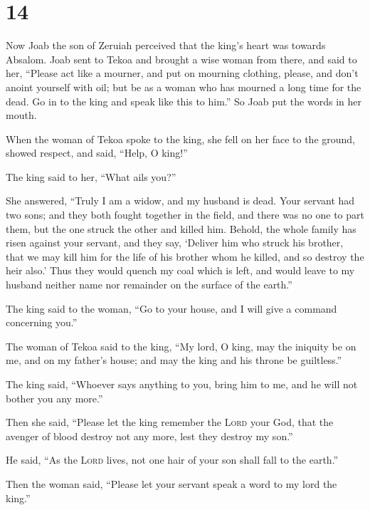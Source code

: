 \hypertarget{section-13}{%
\section{14}\label{section-13}}

 Now Joab the son of Zeruiah perceived that the king's
heart was towards Absalom.  Joab sent to Tekoa and brought
a wise woman from there, and said to her, ``Please act like a mourner,
and put on mourning clothing, please, and don't anoint yourself with
oil; but be as a woman who has mourned a long time for the dead.
 Go in to the king and speak like this to him.'' So Joab
put the words in her mouth.

 When the woman of Tekoa spoke to the king, she fell on
her face to the ground, showed respect, and said, ``Help, O king!''

 The king said to her, ``What ails you?''

She answered, ``Truly I am a widow, and my husband is dead.
 Your servant had two sons; and they both fought together
in the field, and there was no one to part them, but the one struck the
other and killed him.  Behold, the whole family has risen
against your servant, and they say, `Deliver him who struck his brother,
that we may kill him for the life of his brother whom he killed, and so
destroy the heir also.' Thus they would quench my coal which is left,
and would leave to my husband neither name nor remainder on the surface
of the earth.''

 The king said to the woman, ``Go to your house, and I
will give a command concerning you.''

 The woman of Tekoa said to the king, ``My lord, O king,
may the iniquity be on me, and on my father's house; and may the king
and his throne be guiltless.''

 The king said, ``Whoever says anything to you, bring him
to me, and he will not bother you any more.''

 Then she said, ``Please let the king remember the
\textsc{Lord} your God, that the avenger of blood destroy not any more,
lest they destroy my son.''

He said, ``As the \textsc{Lord} lives, not one hair of your son shall
fall to the earth.''

 Then the woman said, ``Please let your servant speak a
word to my lord the king.''

